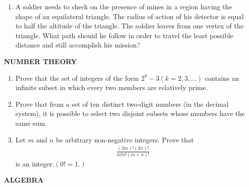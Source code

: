 \documentclass[12pt,-letter paper]{article}
\begin{document}
\begin{enumerate}
\item A soldier needs to check on the presence of mines in a region having the shape of an equilateral triangle. The radius of action of his detector is equal to half the altitude of the triangle. The soldier leaves from one vertex of the triangle. What path shouid he follow in order to travel the least possible distance and still accomplish his mission?



\end{enumerate}

\begin{center}                  

	\textbf{NUMBER THEORY}                                            
\end{center}

\begin{enumerate}

\item Prove that the set of integers of the form $2^k - 3 (k=2,3,\ldots)$ contains an infinite subset in which every two members are relatively prime.

\item Prove that from a set of ten distinct two-digit numbers (in the decimal system), it is possible to select two disjoint subsets whose members have the same sum.

\item Let $m$ and $n$ be arbitrary non-negative integers. Prove that\begin{align} \frac{(2m)!(2n)!}{m!n!(m+n)!} \end {align} is an integer.$ (0! = 1.)$



\end{enumerate}

\begin{center}       

\textbf{ALGEBRA}                  
\end{center}             
		
\end{document}
